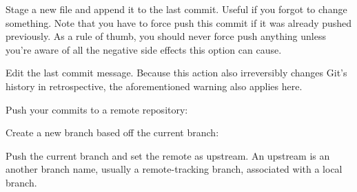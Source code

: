 \begin{flushleft}
\end{flushleft}

\begin{flushleft}
	Stage a new file and append it to the last commit. Useful if you forgot to
	change something. Note that you have to force push this commit if it was
	already pushed previously. As a rule of thumb, you should never force push
	anything unless you're aware of all the negative side effects this option
	can cause.
\end{flushleft}

\begin{flushleft}
\end{flushleft}
\vspace{-0.4cm}
\begin{flushleft}
\end{flushleft}

\begin{flushleft}
	Edit the last commit message. Because this action also irreversibly changes
	Git's history in retrospective, the aforementioned warning also applies here.
\end{flushleft}

\begin{flushleft}
\end{flushleft}

\begin{flushleft}
	Push your commits to a remote repository:
\end{flushleft}

\begin{flushleft}
\end{flushleft}

\begin{flushleft}
	Create a new branch based off the current branch:
\end{flushleft}

\begin{flushleft}
\end{flushleft}

\begin{flushleft}
	Push the current branch and set the remote as upstream. An upstream is an another
	branch name, usually a remote-tracking branch, associated with a local branch.
\end{flushleft}

\begin{flushleft}
\end{flushleft}
